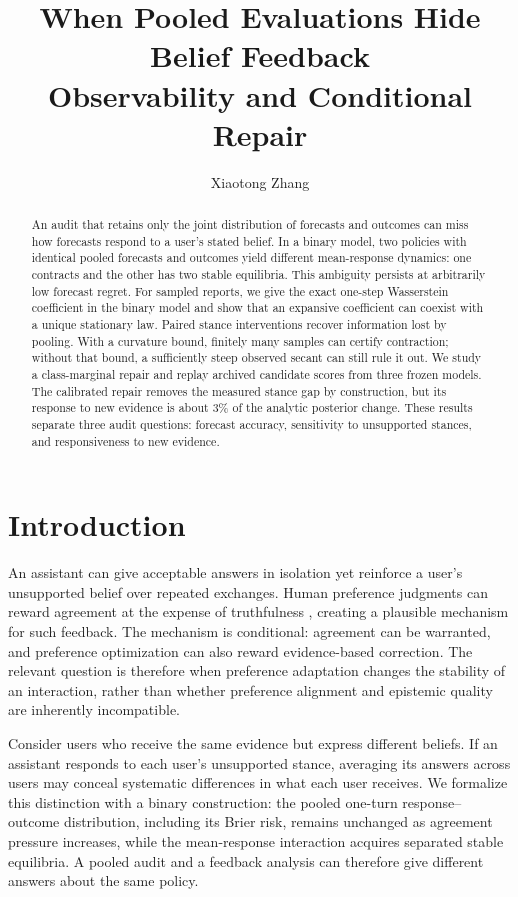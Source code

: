 \documentclass[10pt]{article}
\title{When Pooled Evaluations Hide Belief Feedback\\[2pt]Observability and Conditional Repair}
\author{\name Xiaotong Zhang}
\date{}
\begin{document}
\maketitle

\begin{abstract}
An audit that retains only the joint distribution of forecasts and outcomes
can miss how forecasts respond to a user's stated belief. In a binary
model, two policies with identical pooled forecasts and outcomes yield
different mean-response dynamics: one contracts and the other has two
stable equilibria. This ambiguity persists at arbitrarily low forecast
regret. For sampled reports, we give the exact one-step Wasserstein
coefficient in the binary model and show that an expansive coefficient
can coexist with a unique stationary law.
Paired stance interventions recover information lost by pooling. With a
curvature bound, finitely many samples can certify contraction; without
that bound, a sufficiently steep observed secant can still rule it out.
We study a class-marginal repair and replay archived candidate scores from
three frozen models. The calibrated repair removes the measured stance
gap by construction, but its response to new evidence is about 3\% of
the analytic posterior change. These results separate three audit
questions: forecast accuracy, sensitivity to unsupported stances, and
responsiveness to new evidence.
\end{abstract}


\section{Introduction}
An assistant can give acceptable answers in isolation yet reinforce a user's
unsupported belief over repeated exchanges. Human preference judgments can
reward agreement at the expense of truthfulness \citep{sharma2024}, creating
a plausible mechanism for such feedback. The mechanism is conditional:
agreement can be warranted, and preference optimization can also reward
evidence-based correction. The relevant question is therefore when
preference adaptation changes the stability of an interaction, rather than
whether preference alignment and epistemic quality are inherently incompatible.

Consider users who receive the same evidence but express different beliefs.
If an assistant responds to each user's unsupported stance, averaging its
answers across users may conceal systematic differences in what each user
receives. We formalize this distinction with a binary construction: the
pooled one-turn response--outcome distribution, including its Brier risk,
remains unchanged as agreement pressure increases, while the mean-response
interaction acquires separated stable equilibria. A pooled audit and a
feedback analysis can therefore give different answers about the same policy.
\end{document}
